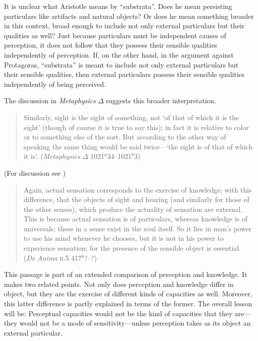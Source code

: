 It is unclear what Aristotle means by ``substrata''. Does he mean persisting particulars like artifacts and natural objects? Or does he mean something broader in this context, broad enough to include not only external particulars but their qualities as well? Just because particulars must be independent causes of perception, it does not follow that they possess their sensible qualities independently of perception. If, on the other hand, in the argument against Protagoras, ``substrata'' is meant to include not only external particulars but their sensible qualities, then external particulars possess their sensible qualities independently of being perceived. 

The discussion in \emph{Metaphysics} \( \Delta \) suggests this broader interpretation.
\begin{quote}
	Similarly, sight is the sight of something, not `of that of which it is the sight' (though of course it is true to say this); in fact it is relative to color or to something else of the sort. But according to the other way of speaking the same thing would be said twice---`the sight is of that of which it is'. (\emph{Metaphysics} \( \Delta \) 1021\( ^{a} \)34--1021\( ^{b} \)3)
\end{quote}
(For discussion see \citealt{Gottlieb:1990kx})

\begin{quote}
	Again, actual sensation corresponds to the exercise of knowledge; with this difference, that the objects of sight and hearing (and similarly for those of the other senses), which produce the actuality of sensation are external. This is because actual sensation is of particulars, whereas knowledge is of universals; these in a sense exist in the soul itself. So it lies in man's power to use his mind whenever he chooses, but it is not in his power to experience sensation; for the presence of the sensible object is essential. (\emph{De Anima} \textsc{ii}.5 417\( ^{b} \)?--?)
\end{quote}
This passage is part of an extended comparison of perception and knowledge. It makes two related points. Not only does perception and knowledge differ in object, but they are the exercise of different kinds of capacities as well. Moreover, this latter difference is partly explained in terms of the former. The overall lesson will be: Perceptual capacities would not be the kind of capacities that they are---they would not be a mode of sensitivity---unless perception takes as its object an external particular.

